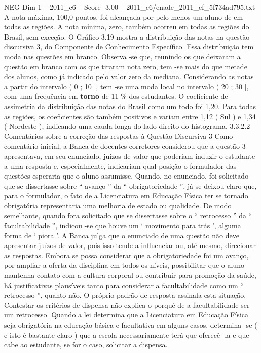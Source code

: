 \begin{textsample}{NEG Dim 1 – 2011\_c6 – Score -3.00 – 2011\_c6/enade\_2011\_ef\_5f734ad795.txt}
A nota máxima, 100,0 pontos, foi alcançada por pelo menos um aluno de em todas as regiões.
A nota mínima, zero, também ocorreu em todas as regiões do Brasil, sem exceção.
O Gráfico 3.19 mostra a distribuição das notas na questão discursiva 3, do Componente de Conhecimento Específico.
Essa distribuição tem moda nas questões em branco.
Observa -se que, reunindo os que deixaram a questão em branco com os que tiraram nota zero, tem -se mais do que metade dos alunos, como já indicado pelo valor zero da mediana.
Considerando as notas a partir do intervalo ( 0 ; 10 ], tem -se uma moda local no intervalo ( 20 ; 30 ], com uma frequência em \textbf{torno} de 11 \% dos estudantes.
O coeficiente de assimetria da distribuição das notas do Brasil como um todo foi 1,20.
Para todas as regiões, os coeficientes são também positivos e variam entre 1,12 ( Sul ) e 1,34 ( Nordeste ), indicando uma cauda longa do lado direito do histograma. 3.3.2.2 Comentários sobre a correção das respostas à Questão Discursiva 3 Como comentário inicial, a Banca de docentes corretores considerou que a questão 3 apresentava, em seu enunciado, juízos de valor que poderiam induzir o estudante a uma resposta e, especialmente, indicariam qual posição o formulador das questões esperaria que o aluno assumisse.
Quando, no enunciado, foi solicitado que se dissertasse sobre “ avanço ” da “ obrigatoriedade ”, já se deixou claro que, para o formulador, o fato de a Licenciatura em Educação Física ter se tornado obrigatória representaria uma melhoria de estado ou qualidade.
De modo semelhante, quando fora solicitado que se dissertasse sobre o “ retrocesso ” da “ facultabilidade ”, indicou -se que houve um ‘ movimento para trás ’, alguma forma de ‘ piora ’.
A Banca julga que o enunciado de uma questão não deve apresentar juízos de valor, pois isso tende a influenciar ou, até mesmo, direcionar as respostas.
Embora se possa considerar que a obrigatoriedade foi um avanço, por ampliar a oferta da disciplina em todos os níveis, possibilitar que o aluno mantenha contato com a cultura corporal ou contribuir para promoção da saúde, há justificativas plausíveis tanto para considerar a facultabilidade como um “ retrocesso ”, quanto não.
O próprio padrão de resposta assinala esta situação.
Contestar os critérios de dispensa não explica o porquê de a facultabilidade ser um retrocesso.
Quando a lei determina que a Licenciatura em Educação Física seja obrigatória na educação básica e facultativa em alguns casos, determina -se ( e isto é bastante claro ) que a escola necessariamente terá que oferecê -la e que cabe ao estudante, se for o caso, solicitar a dispensa.

\end{textsample}
